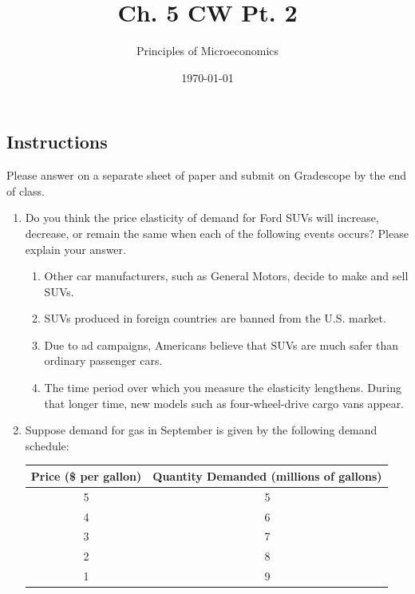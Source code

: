 \documentclass{article}
\title{Ch. 5 CW Pt. 2}
\author{Principles of Microeconomics}
\date{\today}
\begin{document}
\maketitle

\subsection*{Instructions} Please answer on a separate sheet of paper and submit on Gradescope by the end of class.

\begin{enumerate}

\item Do you think the price elasticity of demand for Ford SUVs will increase, decrease, or remain the same when each of the following events occurs? Please explain your answer.

	\begin{enumerate}
	
	\item Other car manufacturers, such as General Motors, decide to make and sell SUVs.
	
	\item SUVs produced in foreign countries are banned from the U.S. market.
	
	\item Due to ad campaigns, Americans believe that SUVs are much safer than ordinary passenger cars.
	
	\item The time period over which you measure the elasticity lengthens. During that longer time, new models such as four-wheel-drive cargo vans appear.
	
	\end{enumerate}

\item Suppose demand for gas in September is given by the following demand schedule:

	\begin{tabular}{| c | c |}
	\hline
	Price (\$ per gallon) & Quantity Demanded (millions of gallons) \\
	\hline
	5 & 5 \\
	\hline
	4 & 6 \\
	\hline
	3 & 7 \\
	\hline
	2 & 8 \\
	\hline
	1 & 9 \\ 
	\hline
	\end{tabular}
	
	\begin{enumerate}
	

\end{enumerate}
\end{enumerate}
\end{document}
